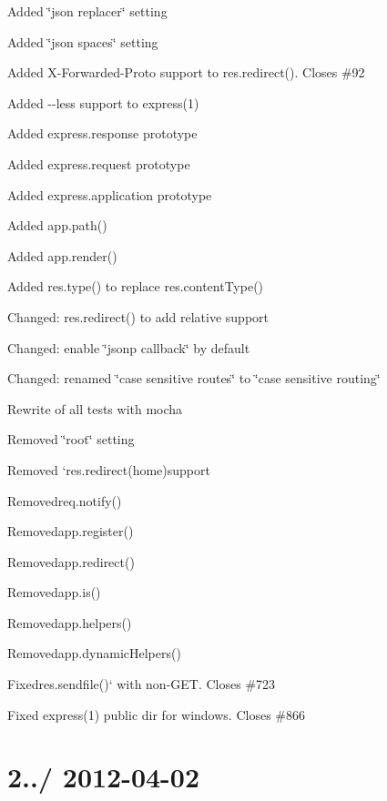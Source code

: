 \begin{DoxyItemize}
\item Added \char`\"{}json replacer\char`\"{} setting
\item Added \char`\"{}json spaces\char`\"{} setting
\item Added X-\/\+Forwarded-\/\+Proto support to {\ttfamily res.\+redirect()}. Closes \#92
\item Added {\ttfamily -\/-\/less} support to express(1)
\item Added {\ttfamily express.\+response} prototype
\item Added {\ttfamily express.\+request} prototype
\item Added {\ttfamily express.\+application} prototype
\item Added {\ttfamily app.\+path()}
\item Added {\ttfamily app.\+render()}
\item Added {\ttfamily res.\+type()} to replace {\ttfamily res.\+content\+Type()}
\item Changed\+: {\ttfamily res.\+redirect()} to add relative support
\item Changed\+: enable \char`\"{}jsonp callback\char`\"{} by default
\item Changed\+: renamed \char`\"{}case sensitive routes\char`\"{} to \char`\"{}case sensitive routing\char`\"{}
\item Rewrite of all tests with mocha
\item Removed \char`\"{}root\char`\"{} setting
\item Removed `res.redirect(\textquotesingle{}home\textquotesingle{}){\ttfamily support}
\item {\ttfamily Removed}req.\+notify(){\ttfamily }
\item {\ttfamily Removed}app.\+register(){\ttfamily }
\item {\ttfamily Removed}app.\+redirect(){\ttfamily }
\item {\ttfamily Removed}app.\+is(){\ttfamily }
\item {\ttfamily Removed}app.\+helpers(){\ttfamily }
\item {\ttfamily Removed}app.\+dynamic\+Helpers(){\ttfamily }
\item {\ttfamily Fixed}res.\+sendfile()` with non-\/\+G\+E\+T. Closes \#723
\item Fixed express(1) public dir for windows. Closes \#866
\end{DoxyItemize}

\section*{2../ 2012-\/04-\/02 }


